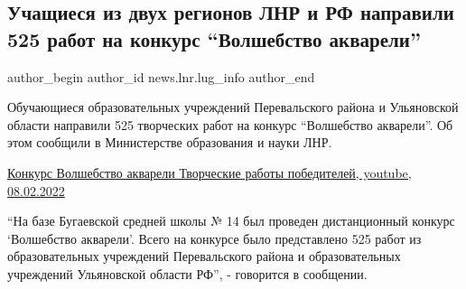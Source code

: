  
 
 
 
 
 
\subsection{Учащиеся из двух регионов ЛНР и РФ направили 525 работ на конкурс \enquote{Волшебство акварели}}
\label{sec:08_02_2022.stz.news.lnr.lug_info.1.konkurs_akvarel}
 
\ifcmt
 author_begin
   author_id news.lnr.lug_info
 author_end
\fi


Обучающиеся образовательных учреждений Перевальского района и Ульяновской
области направили 525 творческих работ на конкурс \enquote{Волшебство акварели}. Об
этом сообщили в Министерстве образования и науки ЛНР.

\href{https://www.youtube.com/watch?v=M_gB1QB8Zis}{%
Конкурс Волшебство акварели Творческие работы победителей, youtube, 08.02.2022%
}


\enquote{На базе Бугаевской средней школы № 14 был проведен дистанционный конкурс
\enquote{Волшебство акварели}. Всего на конкурсе было представлено 525 работ из
образовательных учреждений Перевальского района и образовательных учреждений
Ульяновской области РФ}, - говорится в сообщении.


